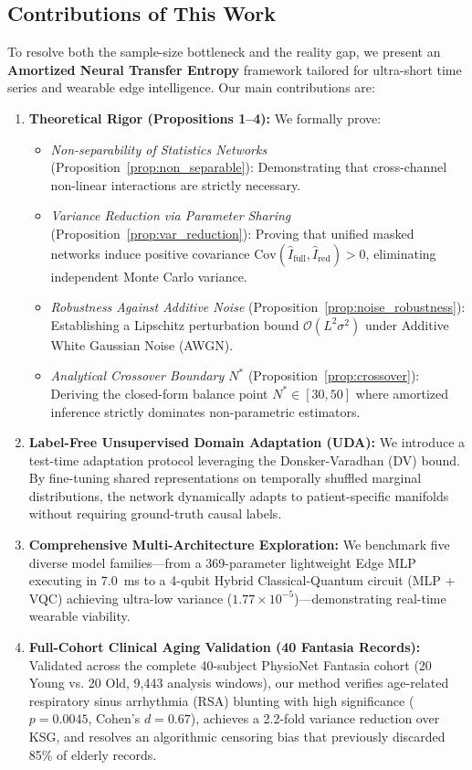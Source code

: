 \subsection{Contributions of This Work}
To resolve both the sample-size bottleneck and the reality gap, we present an \textbf{Amortized Neural Transfer Entropy} framework tailored for ultra-short time series and wearable edge intelligence. Our main contributions are:
\begin{enumerate}
    \item \textbf{Theoretical Rigor (Propositions 1--4):} We formally prove:
    \begin{itemize}
        \item \emph{Non-separability of Statistics Networks} (Proposition~\ref{prop:non_separable}): Demonstrating that cross-channel non-linear interactions are strictly necessary.
        \item \emph{Variance Reduction via Parameter Sharing} (Proposition~\ref{prop:var_reduction}): Proving that unified masked networks induce positive covariance $\mathrm{Cov}(\widehat{I}_{\text{full}}, \widehat{I}_{\text{red}}) > 0$, eliminating independent Monte Carlo variance.
        \item \emph{Robustness Against Additive Noise} (Proposition~\ref{prop:noise_robustness}): Establishing a Lipschitz perturbation bound $\mathcal{O}(L^2 \sigma^2)$ under Additive White Gaussian Noise (AWGN).
        \item \emph{Analytical Crossover Boundary $N^*$} (Proposition~\ref{prop:crossover}): Deriving the closed-form balance point $N^* \in [30, 50]$ where amortized inference strictly dominates non-parametric estimators.
    \end{itemize}
    \item \textbf{Label-Free Unsupervised Domain Adaptation (UDA):} We introduce a test-time adaptation protocol leveraging the Donsker-Varadhan (DV) bound. By fine-tuning shared representations on temporally shuffled marginal distributions, the network dynamically adapts to patient-specific manifolds without requiring ground-truth causal labels.
    \item \textbf{Comprehensive Multi-Architecture Exploration:} We benchmark five diverse model families—from a 369-parameter lightweight Edge MLP executing in 7.0~ms to a 4-qubit Hybrid Classical-Quantum circuit (MLP + VQC) achieving ultra-low variance ($1.77 \times 10^{-5}$)—demonstrating real-time wearable viability.
    \item \textbf{Full-Cohort Clinical Aging Validation (40 Fantasia Records):} Validated across the complete 40-subject PhysioNet Fantasia cohort (20 Young vs. 20 Old, 9,443 analysis windows), our method verifies age-related respiratory sinus arrhythmia (RSA) blunting with high significance ($p = 0.0045$, Cohen's $d = 0.67$), achieves a 2.2-fold variance reduction over KSG, and resolves an algorithmic censoring bias that previously discarded 85\% of elderly records.
\end{enumerate}

